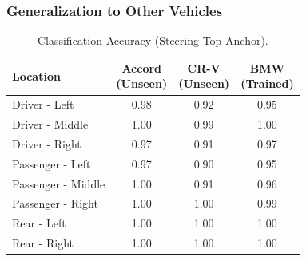 \documentclass[sigconf]{acmart}
\newcommand{\vp}{\vspace{-1.5em}}
\begin{document}
\vspace{-0.05in}
\subsubsection{Generalization to Other Vehicles}


\begin{table}[t]
\centering
\small
\caption{Classification Accuracy (Steering-Top Anchor).}
\label{tab:cross_vehicle_accuracy_steering}
\vp
\begin{tabular}{|l|c|c|c|}
\hline
\textbf{Location} & \makecell[c]{\textbf{Accord} \\ (Unseen)} & \makecell[c]{\textbf{CR-V} \\ (Unseen)} & \makecell[c]{\textbf{BMW} \\ (Trained)} \\ \hline
Driver - Left & 0.98 & 0.92 & 0.95 \\
Driver - Middle & 1.00 & 0.99 & 1.00 \\
Driver - Right & 0.97 & 0.91 & 0.97 \\ \hline
Passenger - Left & 0.97 & 0.90 & 0.95 \\
Passenger - Middle & 1.00 & 0.91 & 0.96 \\
Passenger - Right & 1.00 & 1.00 & 0.99 \\ \hline
Rear - Left & 1.00 & 1.00 & 1.00 \\
Rear - Right & 1.00 & 1.00 & 1.00 \\ \hline
\end{tabular}
\vp
\end{table}
\end{document}
